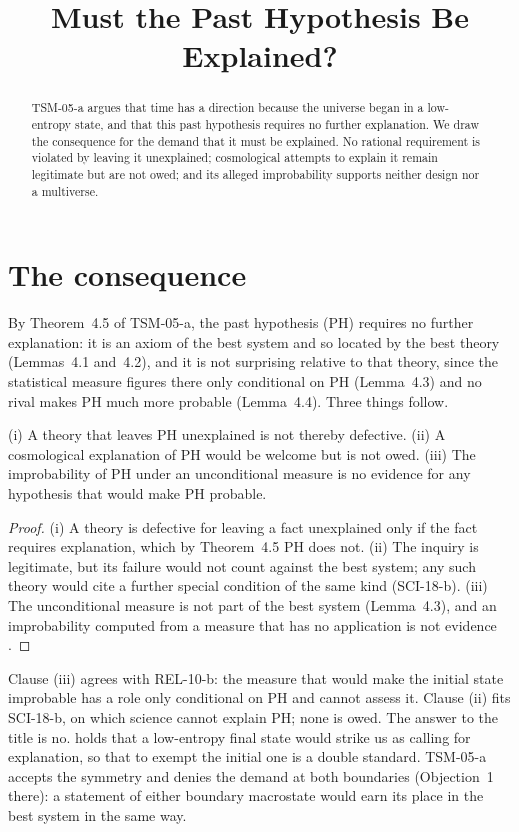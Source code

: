 \documentclass{situationist-preprint}
\title{Must the Past Hypothesis Be Explained?}
\begin{document}
\maketitle

\begin{abstract}
TSM-05-a argues that time has a direction because the universe began in a low-entropy state, and that this past hypothesis requires no further explanation. We draw the consequence for the demand that it must be explained. No rational requirement is violated by leaving it unexplained; cosmological attempts to explain it remain legitimate but are not owed; and its alleged improbability supports neither design nor a multiverse.
\end{abstract}

\section{The consequence}

By Theorem~4.5 of TSM-05-a, the past hypothesis (PH) requires no further explanation: it is an axiom of the best system and so located by the best theory (Lemmas~4.1 and~4.2), and it is not surprising relative to that theory, since the statistical measure figures there only conditional on PH (Lemma~4.3) and no rival makes PH much more probable (Lemma~4.4). Three things follow.

\begin{proposition}\label{p:three}
(i) A theory that leaves PH unexplained is not thereby defective. (ii) A cosmological explanation of PH would be welcome but is not owed. (iii) The improbability of PH under an unconditional measure is no evidence for any hypothesis that would make PH probable.
\end{proposition}

\begin{proof}
(i) A theory is defective for leaving a fact unexplained only if the fact requires explanation, which by Theorem~4.5 PH does not. (ii) The inquiry is legitimate, but its failure would not count against the best system; any such theory would cite a further special condition of the same kind (SCI-18-b). (iii) The unconditional measure is not part of the best system (Lemma~4.3), and an improbability computed from a measure that has no application is not evidence \citep{Callender2004}.
\end{proof}

Clause (iii) agrees with REL-10-b: the measure that would make the initial state improbable has a role only conditional on PH and cannot assess it. Clause (ii) fits SCI-18-b, on which science cannot explain PH; none is owed. The answer to the title is no. \citet{Price1996} holds that a low-entropy final state would strike us as calling for explanation, so that to exempt the initial one is a double standard. TSM-05-a accepts the symmetry and denies the demand at both boundaries (Objection~1 there): a statement of either boundary macrostate would earn its place in the best system in the same way.
\end{document}
